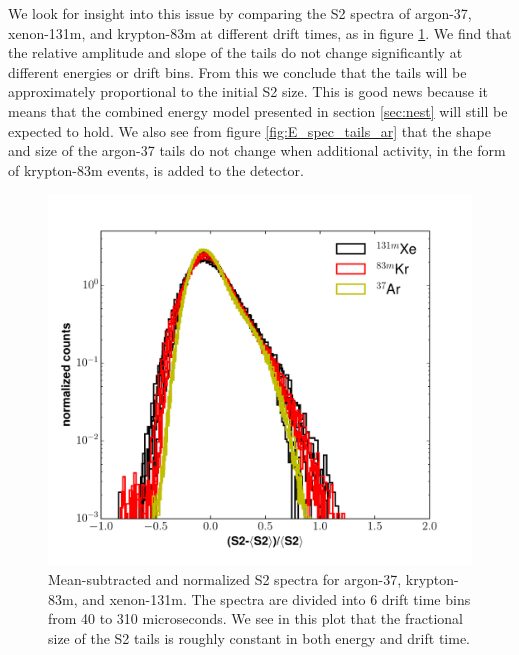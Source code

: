 We look for insight into this issue by comparing the S2 spectra of argon-37, xenon-131m, and krypton-83m at different drift times, as in figure \ref{fig:E_spec_tails}. We find that the relative amplitude and slope of the tails do not change significantly at different energies or drift bins. From this we conclude that the tails will be approximately proportional to the initial S2 size. This is good news because it means that the combined energy model presented in section \ref{sec:nest} will still be expected to hold. We also see from figure \ref{fig:E_spec_tails_ar} that the shape and size of the argon-37 tails do not change when additional activity, in the form of krypton-83m events, is added to the detector.
\begin{figure}[h!]
  \centering
  \includegraphics[width=\textwidth]{Figures/S2_tail_spec_all.pdf}
  \caption{Mean-subtracted and normalized S2 spectra for argon-37, krypton-83m, and xenon-131m. The spectra are divided into 6 drift time bins from 40 to 310 microseconds. We see in this plot that the fractional size of the S2 tails is roughly constant in both energy and drift time.}
\label{fig:E_spec_tails} 
\end{figure}

